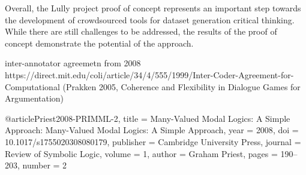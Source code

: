 \documentclass{article}
\begin{document}
Overall, the Lully project proof of concept represents an important step towards the development of crowdsourced tools for dataset generation critical thinking. While there are still challenges to be addressed, the results of the proof of concept demonstrate the potential of the approach.

\newpage


inter-annotator agreemetn from 2008
https://direct.mit.edu/coli/article/34/4/555/1999/Inter-Coder-Agreement-for-Computational
(Prakken 2005, Coherence and Flexibility in Dialogue Games for Argumentation)

@article{Priest2008-PRIMML-2,
	title = {Many-Valued Modal Logics: A Simple Approach: Many-Valued Modal Logics: A Simple Approach},
	year = {2008},
	doi = {10.1017/s1755020308080179},
	publisher = {Cambridge University Press},
	journal = {Review of Symbolic Logic},
	volume = {1},
	author = {Graham Priest},
	pages = {190--203},
	number = {2}
}
\end{document}
